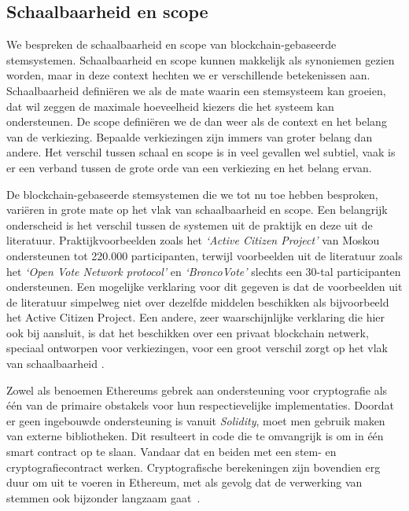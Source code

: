 	\subsection{Schaalbaarheid en scope}
	We bespreken de schaalbaarheid en scope van blockchain-gebaseerde stemsystemen. Schaalbaarheid en scope kunnen makkelijk als synoniemen gezien worden, maar in deze context hechten we er verschillende betekenissen aan. Schaalbaarheid definiëren we als de mate waarin een stemsysteem kan groeien, dat wil zeggen de maximale hoeveelheid kiezers die het systeem kan ondersteunen. De scope definiëren we de dan weer als de context en het belang van de verkiezing. Bepaalde verkiezingen zijn immers van groter belang dan andere. Het verschil tussen schaal en scope is in veel gevallen wel subtiel, vaak is er een verband tussen de grote orde van een verkiezing en het belang ervan.
	
	De blockchain-gebaseerde stemsystemen die we tot nu toe hebben besproken, variëren in grote mate op het vlak van schaalbaarheid en scope. Een belangrijk onderscheid is het verschil tussen de systemen uit de praktijk en deze uit de literatuur. Praktijkvoorbeelden zoals het  \textit{`Active Citizen Project'} van Moskou ondersteunen tot 220.000 participanten, terwijl voorbeelden uit de literatuur zoals het  \textit{`Open Vote Network protocol'} en \textit{`BroncoVote'} slechts een 30-tal participanten ondersteunen. Een mogelijke verklaring voor dit gegeven is dat de voorbeelden uit de literatuur simpelweg niet over dezelfde middelen beschikken als bijvoorbeeld het Active Citizen Project. Een andere, zeer waarschijnlijke verklaring die hier ook bij aansluit, is dat het beschikken over een privaat blockchain netwerk, speciaal ontworpen voor verkiezingen, voor een groot verschil zorgt op het vlak van schaalbaarheid .
	
	 Zowel \textcite{McCorry2017} als \textcite{Dagher2018} benoemen Ethereums gebrek aan ondersteuning voor cryptografie als één van de primaire obstakels voor hun respectievelijke implementaties. Doordat er geen ingebouwde ondersteuning is vanuit \textit{Solidity}, moet men gebruik maken van externe bibliotheken. Dit resulteert in code die te omvangrijk is om in één smart contract op te slaan. Vandaar dat  \textcite{McCorry2017} en \textcite{Dagher2018} beiden met een stem- en cryptografiecontract werken. Cryptografische berekeningen zijn bovendien erg duur om uit te voeren in Ethereum, met als gevolg dat de verwerking van stemmen ook bijzonder langzaam gaat~\autocite{Dagher2018}.
	 
